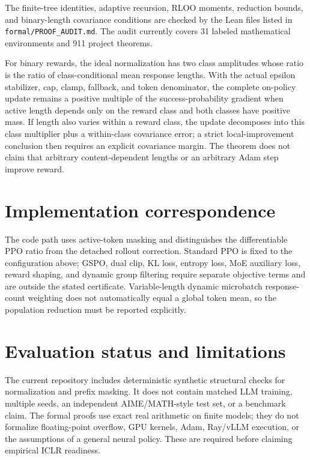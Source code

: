 \documentclass[10pt]{article}
\begin{document}
The finite-tree identities, adaptive recursion, RLOO moments, reduction
bounds, and binary-length covariance conditions are checked by the Lean files
listed in \texttt{formal/PROOF\_AUDIT.md}. The audit currently covers 31 labeled
mathematical environments and 911 project theorems.

For binary rewards, the ideal normalization has two class amplitudes whose
ratio is the ratio of class-conditional mean response lengths. With the actual
epsilon stabilizer, cap, clamp, fallback, and token denominator, the complete
on-policy update remains a positive multiple of the success-probability
gradient when active length depends only on the reward class and both classes
have positive mass. If length also varies within a reward class, the update
decomposes into this class multiplier plus a within-class covariance error; a
strict local-improvement conclusion then requires an explicit covariance
margin. The theorem does not claim that arbitrary content-dependent lengths or
an arbitrary Adam step improve reward.

\section{Implementation correspondence}
The code path uses active-token masking and distinguishes the differentiable
PPO ratio from the detached rollout correction. Standard PPO is fixed to the
configuration above; GSPO, dual clip, KL loss, entropy loss, MoE auxiliary
loss, reward shaping, and dynamic group filtering require separate objective
terms and are outside the stated certificate. Variable-length dynamic
microbatch response-count weighting does not automatically equal a global
token mean, so the population reduction must be reported explicitly.

\section{Evaluation status and limitations}
The current repository includes deterministic synthetic structural checks for
normalization and prefix masking. It does not contain matched LLM training,
multiple seeds, an independent AIME/MATH-style test set, or a benchmark claim.
The formal proofs use exact real arithmetic on finite models; they do not
formalize floating-point overflow, GPU kernels, Adam, Ray/vLLM execution, or
the assumptions of a general neural policy. These are required before claiming
empirical ICLR readiness.



\end{document}
